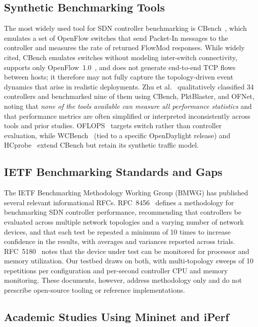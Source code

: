 \documentclass[conference]{IEEEtran}
\begin{document}
\subsection{Synthetic Benchmarking Tools}

The most widely used tool for SDN controller benchmarking is
CBench~\cite{cbench2012}, which emulates a set of OpenFlow switches
that send Packet-In messages to the controller and measures the
rate of returned FlowMod responses. While widely cited, CBench
emulates switches without modeling inter-switch connectivity,
supports only OpenFlow~1.0~\cite{zhu2019benchmarking}, and does not
generate end-to-end TCP flows between hosts; it therefore may not
fully capture the topology-driven event dynamics that arise in
realistic deployments. Zhu et al.~\cite{zhu2019benchmarking}
qualitatively classified 34 controllers and benchmarked nine of
them using CBench, PktBlaster, and OFNet, noting that \emph{none
of the tools available can measure all performance statistics}
and that performance metrics are often simplified or interpreted
inconsistently across tools and prior studies.
OFLOPS~\cite{Rotsos2012OFLOPS} targets switch rather than
controller evaluation, while WCBench~\cite{wcbench2015} (tied to a
specific OpenDaylight release) and HCprobe~\cite{Shalimov2013HCprobe}
extend CBench but retain its synthetic traffic model.

\subsection{IETF Benchmarking Standards and Gaps}

The IETF Benchmarking Methodology Working Group (BMWG) has
published several relevant informational RFCs. RFC~8456~\cite{rfc8456}
defines a methodology for benchmarking SDN controller performance,
recommending that controllers be evaluated across multiple network
topologies and a varying number of network devices, and that each
test be repeated a minimum of 10 times to increase confidence in
the results, with averages and variances reported across trials.
RFC~5180~\cite{rfc5180} notes that the device under test can be
monitored for processor and memory utilization. Our testbed
draws on both, with multi-topology sweeps of 10 repetitions per
configuration and per-second controller CPU and memory monitoring.
These documents, however, address methodology only and do not
prescribe open-source tooling or reference implementations.
\subsection{Academic Studies Using Mininet and iPerf}
\end{document}
